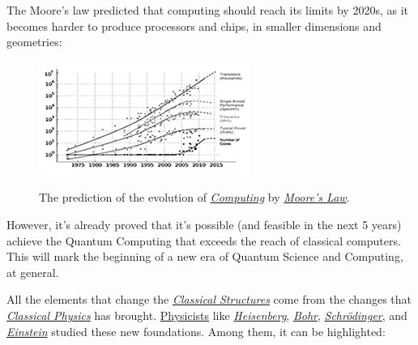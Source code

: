\documentclass[conference]{IEEEtran}
\begin{document}
The Moore's law predicted that computing should reach its limits by 2020s, as it becomes harder to produce processors and chips, in smaller dimensions and geometries:

\begin{center}
  \begin{figure}[htbp]
    \centerline{\href{https://en.wikipedia.org/wiki/Moore\%27s_law}{\includegraphics{imgs/fig-2.png}}}
    \caption{The prediction of the evolution of \href{https://en.wikipedia.org/wiki/Computing}{\textit{Computing}} by \href{https://en.wikipedia.org/wiki/Moore\%27s_law}{\textit{Moore's Law}}.}
    \label{fig}
  \end{figure}
\end{center}

However, it's already proved that it's possible (and feasible in the next 5 years) achieve the Quantum Computing that exceeds the reach of classical computers. This will mark the beginning of a new era of Quantum Science and Computing, at general.

\vspace{4pt}

All the elements that change the \href{https://en.wikipedia.org/wiki/Structure_and_Interpretation_of_Classical_Mechanics}{\textit{Classical Structures}} come from the changes that \href{https://en.wikipedia.org/wiki/Classical_physics}{\textit{Classical Physics}} has brought. \href{https://en.wikipedia.org/wiki/Physicist}{Physicists} like \href{https://en.wikipedia.org/wiki/Werner_Heisenberg}{\textit{Heisenberg}}, \href{https://en.wikipedia.org/wiki/Niels_Bohr}{\textit{Bohr}}, \href{https://en.wikipedia.org/wiki/Erwin_Schr\%C3\%B6dinger}{\textit{Schr\"odinger}}, and \href{https://en.wikipedia.org/wiki/Albert_Einstein}{\textit{Einstein}} studied these new foundations. Among them, it can be highlighted:

\vspace{6pt}
\end{document}
